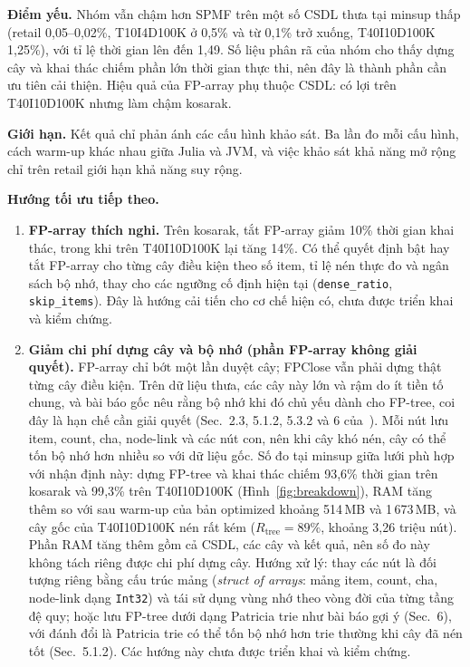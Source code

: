 \textbf{Điểm yếu.} Nhóm vẫn chậm hơn SPMF trên một số CSDL thưa tại minsup thấp (retail 0{,}05–0{,}02\%, T10I4D100K
ở 0{,}5\% và từ 0{,}1\% trở xuống, T40I10D100K 1{,}25\%), với tỉ lệ thời gian lên đến 1{,}49. Số liệu phân rã của nhóm
cho thấy dựng cây và khai thác chiếm phần lớn thời gian thực thi, nên đây là thành phần cần ưu tiên cải thiện. Hiệu
quả của FP-array phụ thuộc CSDL: có lợi trên T40I10D100K nhưng làm chậm kosarak.

\textbf{Giới hạn.} Kết quả chỉ phản ánh các cấu hình khảo sát. Ba lần đo mỗi cấu hình, cách warm-up khác nhau giữa
Julia và JVM, và việc khảo sát khả năng mở rộng chỉ trên retail giới hạn khả năng suy rộng.

\textbf{Hướng tối ưu tiếp theo.}
\begin{enumerate}
  \item \textbf{FP-array thích nghi.} Trên kosarak, tắt FP-array giảm 10\% thời gian khai thác, trong khi trên
        T40I10D100K lại tăng 14\%. Có thể quyết định bật hay tắt FP-array cho từng cây điều kiện theo số item, tỉ lệ
        nén thực đo và ngân sách bộ nhớ, thay cho các ngưỡng cố định hiện tại (\texttt{dense\_ratio},
        \texttt{skip\_items}). Đây là hướng cải tiến cho cơ chế hiện có, chưa được triển khai và kiểm chứng.
  \item \textbf{Giảm chi phí dựng cây và bộ nhớ (phần FP-array không giải quyết).} FP-array chỉ bớt một lần duyệt
        cây; FPClose vẫn phải dựng thật từng cây điều kiện. Trên dữ liệu thưa, các cây này lớn và rậm do ít tiền tố
        chung, và bài báo gốc nêu rằng bộ nhớ khi đó chủ yếu dành cho FP-tree, coi đây là hạn chế cần giải quyết
        (Sec.~2.3, 5.1.2, 5.3.2 và 6 của~\cite{grahne2005}). Mỗi nút lưu item, count, cha, node-link và các nút con,
        nên khi cây khó nén, cây có thể tốn bộ nhớ hơn nhiều so với dữ liệu gốc. Số đo tại minsup giữa lưới phù hợp với
        nhận định này: dựng FP-tree và khai thác chiếm 93{,}6\% thời gian trên kosarak và 99{,}3\% trên T40I10D100K
        (Hình~\ref{fig:breakdown}), RAM tăng thêm so với sau warm-up của bản optimized khoảng 514\,MB và 1\,673\,MB,
        và cây gốc của T40I10D100K nén rất kém ($R_{\text{tree}}=89\%$, khoảng 3{,}26 triệu nút). Phần RAM tăng thêm
        gồm cả CSDL, các cây và kết quả, nên số đo này không tách riêng được chi phí dựng cây. Hướng xử lý: thay các nút
        là đối tượng riêng bằng cấu trúc mảng (\textit{struct of arrays}: mảng item, count, cha, node-link dạng
        \texttt{Int32}) và tái sử dụng vùng nhớ theo vòng đời của từng tầng đệ quy; hoặc lưu FP-tree dưới dạng
        Patricia trie như bài báo gợi ý (Sec.~6), với đánh đổi là Patricia trie có thể tốn bộ nhớ hơn trie thường khi cây
        đã nén tốt (Sec.~5.1.2). Các hướng này chưa được triển khai và kiểm chứng.
\end{enumerate}
